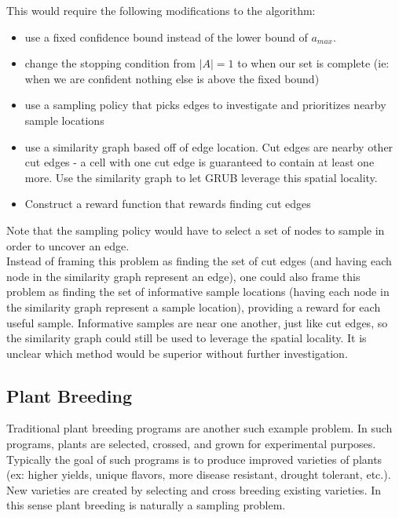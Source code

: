 \documentclass{article}[12pt]
\begin{document}
This would require the following modifications to the algorithm:
\begin{itemize}
    \item use a fixed confidence bound instead of the lower bound of $a_{max}$.
    \item change the stopping condition from $|A|=1$ to when our set is complete (ie: when we are confident nothing else is above the fixed bound)
    \item use a sampling policy that picks edges to investigate and prioritizes nearby sample locations
    \item use a similarity graph based off of edge location. Cut edges are nearby other cut edges - a cell with one cut edge is guaranteed to contain at least one more.
    Use the similarity graph to let GRUB leverage this spatial locality.
    \item Construct a reward function that rewards finding cut edges
\end{itemize}

Note that the sampling policy would have to select a set of nodes to sample in order to uncover an edge. \\

Instead of framing this problem as finding the set of cut edges (and having each node in the similarity graph represent an edge),
one could also frame this problem as finding the set of informative sample locations (having each node in the similarity graph represent a sample location), providing a reward for each useful sample.
Informative samples are near one another, just like cut edges, so the similarity graph could still be used to leverage the spatial locality.
It is unclear which method would be superior without further investigation.

\subsection{Plant Breeding}

Traditional plant breeding programs are another such example problem.
In such programs, plants are selected, crossed, and grown for experimental purposes.
Typically the goal of such programs is to produce improved varieties of plants (ex: higher yields, unique flavors, more disease resistant, drought tolerant, etc.).
New varieties are created by selecting and cross breeding existing varieties. In this sense plant breeding is naturally a sampling problem. \\
\end{document}
